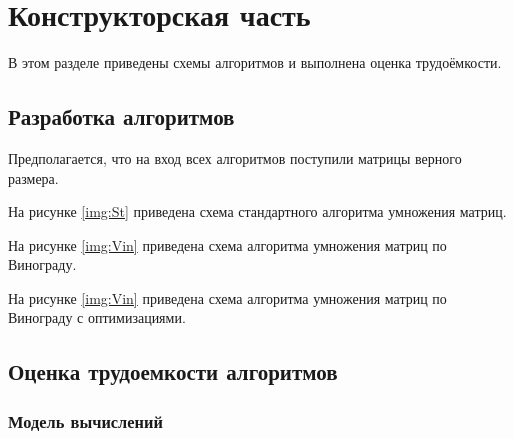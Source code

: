 \chapter{Конструкторская часть}
В этом разделе приведены схемы алгоритмов и выполнена оценка трудоёмкости.

\section{Разработка алгоритмов}

Предполагается, что на вход всех алгоритмов поступили матрицы верного размера.

На рисунке \ref{img:St} приведена схема стандартного алгоритма умножения матриц.
\clearpage

На рисунке \ref{img:Vin} приведена схема алгоритма умножения матриц по Винограду.
\clearpage

На рисунке \ref{img:Vin} приведена схема алгоритма умножения матриц по Винограду с оптимизациями.
\clearpage

\section{Оценка трудоемкости алгоритмов}

\subsection{Модель вычислений}

